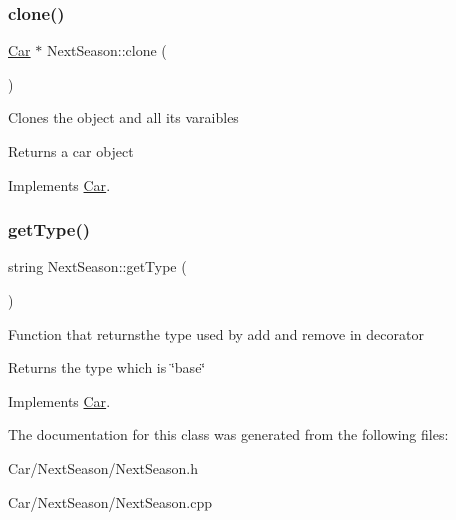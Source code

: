 \subsubsection{\texorpdfstring{clone()}{clone()}}
{\footnotesize\ttfamily \hyperlink{classCar}{Car} $\ast$ Next\+Season\+::clone (\begin{DoxyParamCaption}{ }\end{DoxyParamCaption})\hspace{0.3cm}{\ttfamily [virtual]}}

Clones the object and all its varaibles \begin{DoxyReturn}{Returns}
a car object 
\end{DoxyReturn}


Implements \hyperlink{classCar_a5a54bbfe8e72022f4d9fdf6ecc990d99}{Car}.

\mbox{\label{classNextSeason_abe6df1f0b67eddbf990e9a92f6f68ff4}} 
\subsubsection{\texorpdfstring{get\+Type()}{getType()}}
{\footnotesize\ttfamily string Next\+Season\+::get\+Type (\begin{DoxyParamCaption}{ }\end{DoxyParamCaption})\hspace{0.3cm}{\ttfamily [virtual]}}

Function that returnsthe type used by add and remove in decorator \begin{DoxyReturn}{Returns}
the type which is \char`\"{}base\char`\"{} 
\end{DoxyReturn}


Implements \hyperlink{classCar_ae502eb1c04753317ebdb759497fd030c}{Car}.



The documentation for this class was generated from the following files\+:\begin{DoxyCompactItemize}
\item 
Car/\+Next\+Season/Next\+Season.\+h\item 
Car/\+Next\+Season/Next\+Season.\+cpp\end{DoxyCompactItemize}
